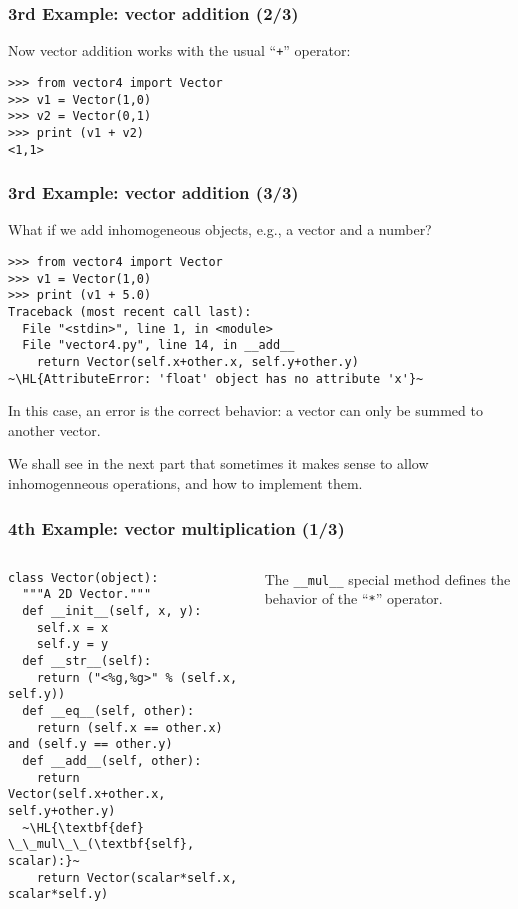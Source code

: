 \documentclass[english,serif,mathserif,xcolor=pdftex,dvipsnames,table]{beamer}
\begin{document}
\begin{frame}[fragile]
  \frametitle{3rd Example: vector addition (2/3)}

  Now vector addition works with the usual ``\texttt{+}'' operator:
\begin{lstlisting}
>>> from vector4 import Vector
>>> v1 = Vector(1,0)
>>> v2 = Vector(0,1)
>>> print (v1 + v2)
<1,1>
\end{lstlisting}
\end{frame}


\begin{frame}[fragile]
  \frametitle{3rd Example: vector addition (3/3)}

  What if we add inhomogeneous objects, e.g., a vector and a number?
\begin{lstlisting}
>>> from vector4 import Vector
>>> v1 = Vector(1,0)
>>> print (v1 + 5.0)
Traceback (most recent call last):
  File "<stdin>", line 1, in <module>
  File "vector4.py", line 14, in __add__
    return Vector(self.x+other.x, self.y+other.y)
~\HL{AttributeError: 'float' object has no attribute 'x'}~
\end{lstlisting}

  \+ In this case, an error is the correct behavior: a vector can only
  be summed to another vector.

  \+ We shall see in the next part that sometimes it makes sense to
  allow inhomogenneous operations, and how to implement them.
\end{frame}

\begin{frame}[fragile]
  \frametitle{4th Example: vector multiplication (1/3)}
  \begin{columns}[t]
    \begin{column}{0.5\textwidth}
\begin{lstlisting}
class Vector(object):
  """A 2D Vector."""
  def __init__(self, x, y):
    self.x = x
    self.y = y
  def __str__(self):
    return ("<%g,%g>" % (self.x, self.y))
  def __eq__(self, other):
    return (self.x == other.x) and (self.y == other.y)
  def __add__(self, other):
    return Vector(self.x+other.x, self.y+other.y)
  ~\HL{\textbf{def} \_\_mul\_\_(\textbf{self}, scalar):}~
    return Vector(scalar*self.x, scalar*self.y)
\end{lstlisting}
    \end{column}
    \begin{column}{0.5\textwidth}
      \raggedleft
      The \lstinline|__mul__| special method defines the behavior of
      the ``\texttt{*}'' operator.
    \end{column}
  \end{columns}
\end{frame}
\end{document}
